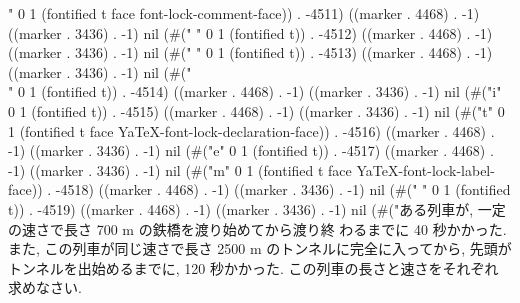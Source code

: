 " 0 1 (fontified t face font-lock-comment-face)) . -4511) ((marker . 4468) . -1) ((marker . 3436) . -1) nil (#(" " 0 1 (fontified t)) . -4512) ((marker . 4468) . -1) ((marker . 3436) . -1) nil (#(" " 0 1 (fontified t)) . -4513) ((marker . 4468) . -1) ((marker . 3436) . -1) nil (#("\\" 0 1 (fontified t)) . -4514) ((marker . 4468) . -1) ((marker . 3436) . -1) nil (#("i" 0 1 (fontified t)) . -4515) ((marker . 4468) . -1) ((marker . 3436) . -1) nil (#("t" 0 1 (fontified t face YaTeX-font-lock-declaration-face)) . -4516) ((marker . 4468) . -1) ((marker . 3436) . -1) nil (#("e" 0 1 (fontified t)) . -4517) ((marker . 4468) . -1) ((marker . 3436) . -1) nil (#("m" 0 1 (fontified t face YaTeX-font-lock-label-face)) . -4518) ((marker . 4468) . -1) ((marker . 3436) . -1) nil (#(" " 0 1 (fontified t)) . -4519) ((marker . 4468) . -1) ((marker . 3436) . -1) nil (#("ある列車が, 一定の速さで長さ 700 m の鉄橋を渡り始めてから渡り終
	わるまでに 40 秒かかった. また, この列車が同じ速さで長さ 2500 m
	のトンネルに完全に入ってから, 先頭がトンネルを出始めるまでに, 120
	秒かかった. この列車の長さと速さをそれぞれ求めなさい.
